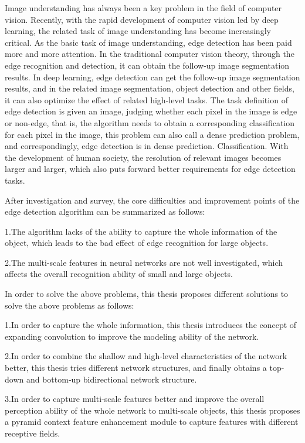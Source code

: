 \documentclass[master]{thesis-uestc}
\begin{document}
\begin{englishabstract}
    Image understanding has always been a key problem in the field of computer vision. Recently, with the rapid development of computer vision led by deep learning, the related task of image  understanding has become increasingly critical. As the basic task of image understanding, edge detection has been paid more and more attention. In the traditional computer vision theory, through the edge recognition and detection, it can obtain the follow-up image segmentation results. In deep learning, edge detection can get the follow-up image segmentation results, and in the related image segmentation, object detection and other fields, it can also optimize the effect of related high-level tasks. The task definition of edge detection is given an image,  judging whether each pixel in the image is edge or non-edge, that is, the algorithm needs to obtain a corresponding classification for each pixel in the image, this problem can also call a dense prediction problem, and correspondingly, edge detection is in dense prediction. Classification. With the development of human society, the resolution of relevant images becomes larger and larger, which also puts forward better requirements for edge detection tasks.

    After investigation and survey, the core difficulties and improvement points of the edge detection algorithm can be summarized as follows:
    
    1.The algorithm lacks of the ability to capture the whole information of the object, which leads to the bad effect of edge recognition for large objects.
    
    2.The multi-scale features in neural networks are not well investigated, which affects the overall recognition ability of small and large objects.
    
    In order to solve the above problems, this thesis proposes different solutions to solve the above problems as follows:
    
    1.In order to capture the whole information, this thesis introduces the concept of expanding convolution to improve the modeling ability of the network.
    
    2.In order to combine the shallow and high-level characteristics of the network better, this thesis tries different network structures, and finally obtains a top-down and bottom-up bidirectional network structure.
    
    3.In order to capture multi-scale features better and improve the overall perception ability of the whole network to multi-scale objects, this thesis proposes a pyramid context feature enhancement module to capture features with different receptive fields.
    

\end{englishabstract}
\end{document}
